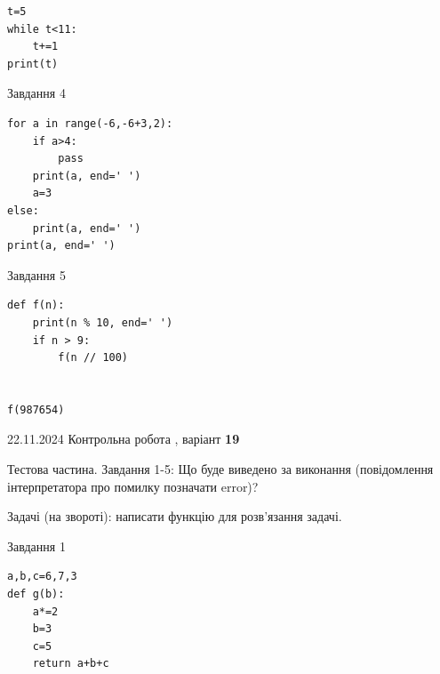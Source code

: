 \documentclass[12pt, ukrainian]{article}
\begin{document}
{{{{{{{{{{{{{{{{{{\begin{minipage}[t]{8.5cm}
\begin{verbatim}
t=5
while t<11:
    t+=1
print(t)
\end{verbatim}


\end{minipage}
\vline \hspace{6mm}
\begin{minipage}[t]{10.7cm}
               
{\begin{center}Завдання {4}\end{center}}
\vspace{-6mm}

\begin{verbatim}
for a in range(-6,-6+3,2):
    if a>4:
        pass
    print(a, end=' ')
    a=3
else:
    print(a, end=' ')
print(a, end=' ')
\end{verbatim}


\vspace{5mm}
               
{\begin{center}Завдання {5}\end{center}}
\vspace{-6mm}

\begin{verbatim}
def f(n):
    print(n % 10, end=' ')
    if n > 9:
        f(n // 100)
    

f(987654)
\end{verbatim}


\end{minipage}

\newpage

{{22.11.2024 Контрольна робота , варіант  \No \textbf { 19 }\par}}
{

Тестова частина. Завдання 1-5: Що буде виведено за виконання (повідомлення інтерпретатора про помилку позначати error)?

Задачі (на звороті): написати функцію для розв'язання задачі.

\vspace{5mm} \begin{minipage}[t]{8.5cm}
               
{\begin{center}Завдання {1}\end{center}}
\vspace{-6mm}

\begin{verbatim}
a,b,c=6,7,3
def g(b):
    a*=2
    b=3
    c=5
    return a+b+c


\end{verbatim}
\end{minipage}}}}}}}}}}}}}}}}}}}}
\end{document}
